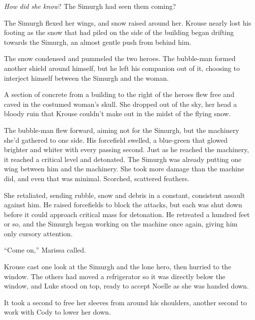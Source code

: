 \emph{How did she know}?  The Simurgh had seen them coming?



The Simurgh flexed her wings, and snow raised around her.  Krouse nearly lost his footing as the snow that had piled on the side of the building began drifting towards the Simurgh, an almost gentle push from behind him.



The snow condensed and pummeled the two heroes.  The bubble-man formed another shield around himself, but he left his companion out of it, choosing to interject himself between the Simurgh and the woman.



A section of concrete from a building to the right of the heroes flew free and caved in the costumed woman's skull.  She dropped out of the sky, her head a bloody ruin that Krouse couldn't make out in the midst of the flying snow.



The bubble-man flew forward, aiming not for the Simurgh, but the machinery she'd gathered to one side.  His forcefield swelled, a blue-green that glowed brighter and whiter with every passing second.  Just as he reached the machinery, it reached a critical level and detonated.  The Simurgh was already putting one wing between him and the machinery.  She took more damage than the machine did, and even that was minimal.  Scorched, scattered feathers.



She retaliated, sending rubble, snow and debris in a constant, consistent assault against him.  He raised forcefields to block the attacks, but each was shut down before it could approach critical mass for detonation.  He retreated a hundred feet or so, and the Simurgh began working on the machine once again, giving him only cursory attention.



``Come on,'' Marissa called.



Krouse cast one look at the Simurgh and the lone hero, then hurried to the window.  The others had moved a refrigerator so it was directly below the window, and Luke stood on top, ready to accept Noelle as she was handed down.



It took a second to free her sleeves from around his shoulders, another second to work with Cody to lower her down.



